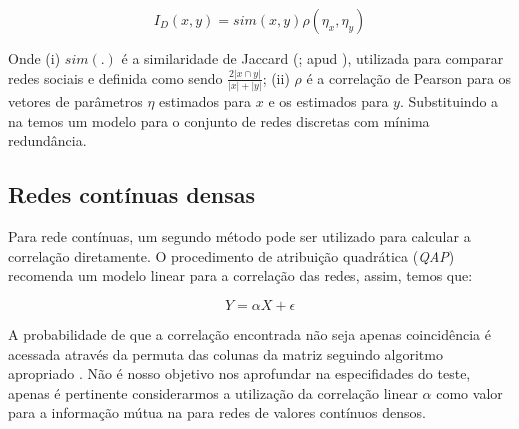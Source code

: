 \begin{equation}
\label{def:MI_discreto}
I_D(x, y) = sim(x,y) \rho(\eta_x, \eta_y)
\end{equation}

Onde (i) $sim(.)$ é a similaridade de Jaccard (\citealt{Jaccard1912}; apud
\citealt{Berger-Wolf2006}), utilizada para comparar redes sociais e definida como
sendo $\frac{2|x\cap y|}{|x| + |y|}$; (ii) $\rho$ é a correlação de Pearson para
os vetores de parâmetros $\eta$ estimados para $x$ e os estimados para $y$.
Substituindo a  na  temos um
modelo para o conjunto de redes discretas com mínima redundância.

\subsection{Redes contínuas densas}

Para rede contínuas, um segundo método pode ser utilizado para calcular a
correlação diretamente. O procedimento de atribuição quadrática (\textit{QAP})
recomenda um modelo linear para a correlação das redes, assim, temos que:

\begin{equation}
\label{def:linear_model_qap}
Y = \alpha X + \epsilon
\end{equation}

A probabilidade de que a correlação encontrada não seja apenas coincidência é
acessada através da permuta das colunas da matriz seguindo algoritmo apropriado
\citep{Anderson2001, Dekker2007}. Não é nosso objetivo nos aprofundar na
especifidades do teste, apenas é pertinente considerarmos a  utilização da
correlação linear $\alpha$ como valor para a informação mútua na
 para redes de valores contínuos densos.
